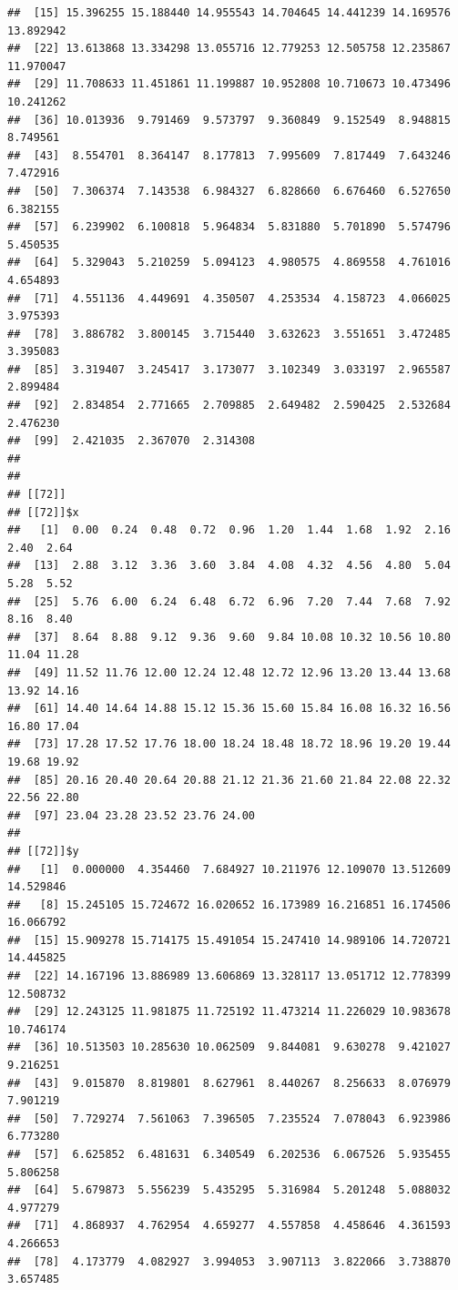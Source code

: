 \documentclass[
  ignorenonframetext,
]{beamer}
\begin{document}
\begin{frame}[fragile]{}
\begin{verbatim}
##  [15] 15.396255 15.188440 14.955543 14.704645 14.441239 14.169576 13.892942
##  [22] 13.613868 13.334298 13.055716 12.779253 12.505758 12.235867 11.970047
##  [29] 11.708633 11.451861 11.199887 10.952808 10.710673 10.473496 10.241262
##  [36] 10.013936  9.791469  9.573797  9.360849  9.152549  8.948815  8.749561
##  [43]  8.554701  8.364147  8.177813  7.995609  7.817449  7.643246  7.472916
##  [50]  7.306374  7.143538  6.984327  6.828660  6.676460  6.527650  6.382155
##  [57]  6.239902  6.100818  5.964834  5.831880  5.701890  5.574796  5.450535
##  [64]  5.329043  5.210259  5.094123  4.980575  4.869558  4.761016  4.654893
##  [71]  4.551136  4.449691  4.350507  4.253534  4.158723  4.066025  3.975393
##  [78]  3.886782  3.800145  3.715440  3.632623  3.551651  3.472485  3.395083
##  [85]  3.319407  3.245417  3.173077  3.102349  3.033197  2.965587  2.899484
##  [92]  2.834854  2.771665  2.709885  2.649482  2.590425  2.532684  2.476230
##  [99]  2.421035  2.367070  2.314308
## 
## 
## [[72]]
## [[72]]$x
##   [1]  0.00  0.24  0.48  0.72  0.96  1.20  1.44  1.68  1.92  2.16  2.40  2.64
##  [13]  2.88  3.12  3.36  3.60  3.84  4.08  4.32  4.56  4.80  5.04  5.28  5.52
##  [25]  5.76  6.00  6.24  6.48  6.72  6.96  7.20  7.44  7.68  7.92  8.16  8.40
##  [37]  8.64  8.88  9.12  9.36  9.60  9.84 10.08 10.32 10.56 10.80 11.04 11.28
##  [49] 11.52 11.76 12.00 12.24 12.48 12.72 12.96 13.20 13.44 13.68 13.92 14.16
##  [61] 14.40 14.64 14.88 15.12 15.36 15.60 15.84 16.08 16.32 16.56 16.80 17.04
##  [73] 17.28 17.52 17.76 18.00 18.24 18.48 18.72 18.96 19.20 19.44 19.68 19.92
##  [85] 20.16 20.40 20.64 20.88 21.12 21.36 21.60 21.84 22.08 22.32 22.56 22.80
##  [97] 23.04 23.28 23.52 23.76 24.00
## 
## [[72]]$y
##   [1]  0.000000  4.354460  7.684927 10.211976 12.109070 13.512609 14.529846
##   [8] 15.245105 15.724672 16.020652 16.173989 16.216851 16.174506 16.066792
##  [15] 15.909278 15.714175 15.491054 15.247410 14.989106 14.720721 14.445825
##  [22] 14.167196 13.886989 13.606869 13.328117 13.051712 12.778399 12.508732
##  [29] 12.243125 11.981875 11.725192 11.473214 11.226029 10.983678 10.746174
##  [36] 10.513503 10.285630 10.062509  9.844081  9.630278  9.421027  9.216251
##  [43]  9.015870  8.819801  8.627961  8.440267  8.256633  8.076979  7.901219
##  [50]  7.729274  7.561063  7.396505  7.235524  7.078043  6.923986  6.773280
##  [57]  6.625852  6.481631  6.340549  6.202536  6.067526  5.935455  5.806258
##  [64]  5.679873  5.556239  5.435295  5.316984  5.201248  5.088032  4.977279
##  [71]  4.868937  4.762954  4.659277  4.557858  4.458646  4.361593  4.266653
##  [78]  4.173779  4.082927  3.994053  3.907113  3.822066  3.738870  3.657485

\end{verbatim}
\end{frame}
\end{document}
